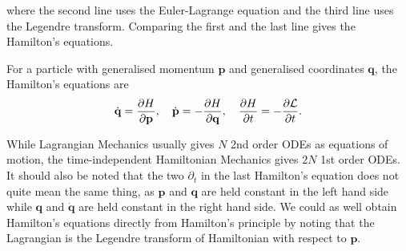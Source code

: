 \documentclass{article}
\theoremstyle{nonumberplain}
\begin{document}
where the second line uses the Euler-Lagrange equation and the third line uses the Legendre transform. Comparing the first and the last line gives the Hamilton's equations. 
\begin{frm-thm}
    For a particle with generalised momentum $\mathbf{p} $ and generalised coordinates $\mathbf{q}$, the Hamilton's equations are 
    \[
        \dot{\mathbf{q}} = \frac{\partial H}{\partial \mathbf{p} } , \quad 
        \dot{\mathbf{p}} = - \frac{\partial H}{\partial \mathbf{q} }  , \quad 
        \frac{\partial H}{\partial t} = -\frac{\partial \mathcal{\MakeUppercase{L}} }{\partial t} .
    \]
\end{frm-thm}
While Lagrangian Mechanics usually gives $N$ 2nd order ODEs as equations of motion, the time-independent Hamiltonian Mechanics gives $2N$ 1st order ODEs. It should also be noted that the two $\partial_t$ in the last Hamilton's equation does not quite mean the same thing, as $\mathbf{p}$ and $\mathbf{q} $ are held constant in the left hand side while  $\mathbf{q} $ and $\dot{\mathbf{q} }$ are held constant in the right hand side. We could as well obtain Hamilton's equations directly from Hamilton's principle by noting that the Lagrangian is the Legendre transform of Hamiltonian with respect to $\mathbf{p} $. 
\end{document}

